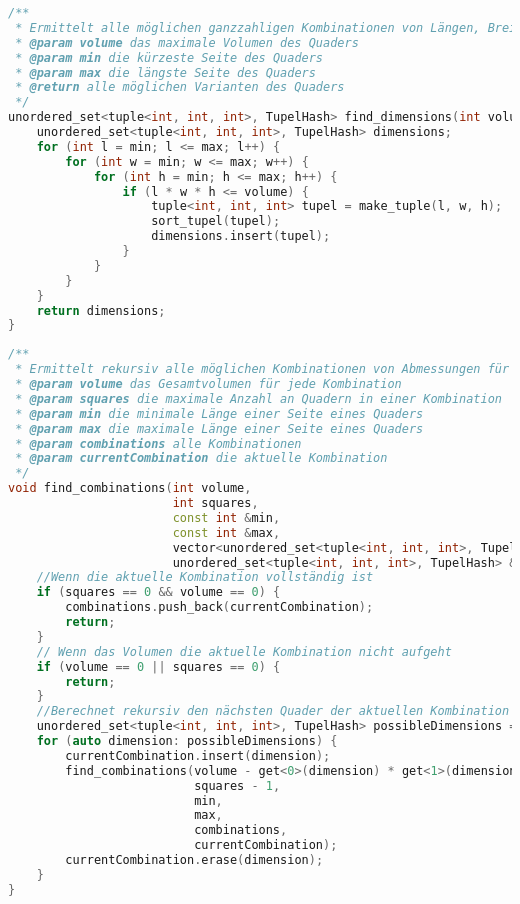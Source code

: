 \documentclass[a4paper,10pt,ngerman]{scrartcl}
\begin{document}
    \begin{lstlisting}[frame=single,language=C++,title=Methode find\_dimensions,breaklines=true,label={lst:code_findDimensions}]
/**
 * Ermittelt alle möglichen ganzzahligen Kombinationen von Längen, Breiten und Höhen für einen Quader
 * @param volume das maximale Volumen des Quaders
 * @param min die kürzeste Seite des Quaders
 * @param max die längste Seite des Quaders
 * @return alle möglichen Varianten des Quaders
 */
unordered_set<tuple<int, int, int>, TupelHash> find_dimensions(int volume, const int &min, const int &max) {
    unordered_set<tuple<int, int, int>, TupelHash> dimensions;
    for (int l = min; l <= max; l++) {
        for (int w = min; w <= max; w++) {
            for (int h = min; h <= max; h++) {
                if (l * w * h <= volume) {
                    tuple<int, int, int> tupel = make_tuple(l, w, h);
                    sort_tupel(tupel);
                    dimensions.insert(tupel);
                }
            }
        }
    }
    return dimensions;
}
    \end{lstlisting}

    \begin{lstlisting}[frame=single,language=C++,title=Methode find\_combinations,breaklines=true,label={lst:code_findCombinations}]
/**
 * Ermittelt rekursiv alle möglichen Kombinationen von Abmessungen für beliebig viele Quader
 * @param volume das Gesamtvolumen für jede Kombination
 * @param squares die maximale Anzahl an Quadern in einer Kombination
 * @param min die minimale Länge einer Seite eines Quaders
 * @param max die maximale Länge einer Seite eines Quaders
 * @param combinations alle Kombinationen
 * @param currentCombination die aktuelle Kombination
 */
void find_combinations(int volume,
                       int squares,
                       const int &min,
                       const int &max,
                       vector<unordered_set<tuple<int, int, int>, TupelHash>> &combinations,
                       unordered_set<tuple<int, int, int>, TupelHash> &currentCombination) {
    //Wenn die aktuelle Kombination vollständig ist
    if (squares == 0 && volume == 0) {
        combinations.push_back(currentCombination);
        return;
    }
    // Wenn das Volumen die aktuelle Kombination nicht aufgeht
    if (volume == 0 || squares == 0) {
        return;
    }
    //Berechnet rekursiv den nächsten Quader der aktuellen Kombination
    unordered_set<tuple<int, int, int>, TupelHash> possibleDimensions = find_dimensions(volume, min, max);
    for (auto dimension: possibleDimensions) {
        currentCombination.insert(dimension);
        find_combinations(volume - get<0>(dimension) * get<1>(dimension) * get<2>(dimension),
                          squares - 1,
                          min,
                          max,
                          combinations,
                          currentCombination);
        currentCombination.erase(dimension);
    }
}
    \end{lstlisting}
\end{document}
